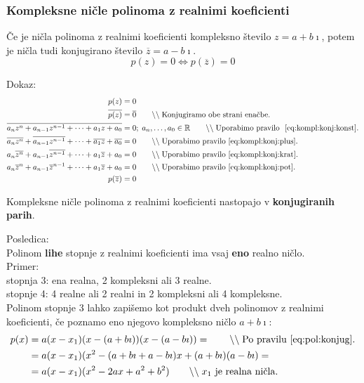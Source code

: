 \documentclass[a4paper,oneside,12pt,fleqn]{article}
\def\R{\ensuremath{\mathbb R}}
\newcommand{\comment}[1]{\ensuremath{\qquad\backslash\backslash\;}\textnormal{#1}}
\newcommand{\ii}{\ensuremath{\imath}}
\def\konj{\overline} %
\renewcommand\iff\Leftrightarrow
\numberwithin{equation}{section}
\begin{document}
\subsubsection{Kompleksne ničle polinoma z realnimi koeficienti}
\label{sec:pol:nic:kompl}
Če je ničla polinoma z realnimi koeficienti kompleksno število $z=a+b\ii$, potem je ničla
tudi konjugirano število $\konj{z} = a-b\ii$.
\begin{equation}
  p(z) = 0 \iff p(\konj{z}) = 0 \label{eq:pol:konjug}
\end{equation}

Dokaz:
\begin{align*}
  p(z) &= 0 \\
  \konj{p(z)} &= \konj{0} \comment{Konjugiramo obe strani enačbe.} \\
  \konj{a_nz^n+a_{n-1}z^{n-1}+\cdots+a_1z+a_0} &= 0; \; a_n,\ldots,a_0 \in \R \comment{Uporabimo pravilo~
  \eqref{eq:kompl:konj:konst}.} \\
  \konj{a_nz^n}+\konj{a_{n-1}z^{n-1}}+\cdots+\konj{a_1z}+\konj{a_0} &= 0
  \comment{Uporabimo pravilo~\eqref{eq:kompl:konj:plus}.} \\
  a_n\konj{z^n}+a_{n-1}\konj{z^{n-1}}+\cdots+a_1\konj{z}+a_0 &= 0 \comment{Uporabimo
  pravilo~\eqref{eq:kompl:konj:krat}.} \\
  a_n\konj{z}^n+a_{n-1}\konj{z}^{n-1}+\cdots+a_1\konj{z}+a_0 &= 0 \comment{Uporabimo
  pravilo~\eqref{eq:kompl:konj:pot}.}\\
  p(\konj{z}) &= 0
\end{align*}

Kompleksne ničle polinoma z realnimi koeficienti nastopajo v \textbf{konjugiranih parih}.

Posledica: \\
Polinom \textbf{lihe} stopnje z realnimi koeficienti ima vsaj \textbf{eno} realno ničlo. \\
Primer: \\
stopnja 3: ena realna, 2 kompleksni ali 3 realne. \\
stopnje 4: 4 realne ali 2 realni in 2 kompleksni ali 4 kompleksne. \\

Polinom stopnje 3 lahko zapišemo kot produkt dveh polinomov z realnimi koeficienti, če
poznamo eno njegovo kompleksno ničlo $a+b\ii$:
\begin{align*}
  p(x) &= a(x-x_1)(x-(a+b\ii))(x-(a-b\ii)) = \comment{Po pravilu \eqref{eq:pol:konjug}.} \\
  &= a(x-x_1)(x^2 -(a+b\ii+a-b\ii)x + (a+b\ii)(a-b\ii) = \\
  &= a(x-x_1)(x^2 -2ax + a^2+b^2) \comment{$x_1$ je realna ničla.}
\end{align*}
\end{document}
